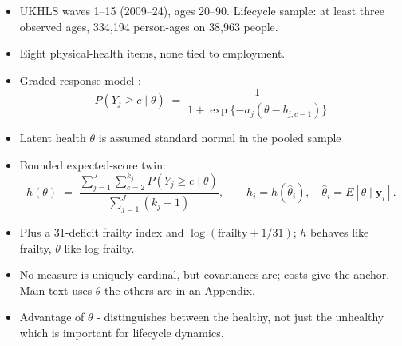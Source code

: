 \documentclass[11pt]{article}
\begin{document}

\begin{itemize}
	\item UKHLS waves 1--15 (2009--24), ages 20--90. Lifecycle sample: at least three observed ages, 334,194 person-ages on 38,963 people.
	\item Eight physical-health items, none tied to employment.
	\item Graded-response model \citep{samejima1969}:
	\begin{equation}
		P(Y_j \ge c \mid \theta) \;=\; \frac{1}{1 + \exp\{-a_j(\theta - b_{j,c-1})\}}
	\end{equation}
	\item Latent health $\theta$ is assumed standard normal in the pooled sample
	\item Bounded expected-score twin:
	\begin{equation}
		h(\theta) \;=\; \frac{\sum_{j=1}^{J} \sum_{c=2}^{k_j} P(Y_j \ge c \mid \theta)}{\sum_{j=1}^{J} (k_j - 1)},
		\qquad h_i = h(\hat\theta_i), \quad \hat\theta_i = E[\theta \mid \mathbf{y}_i].
	\end{equation}
	\item Plus a 31-deficit frailty index and $\log(\text{frailty}+1/31)$; $h$ behaves like frailty, $\theta$ like log frailty.
	\item No measure is uniquely cardinal, but covariances are; costs give the anchor. Main text uses $\theta$ the others are in an Appendix.
	\item Advantage of $\theta$ - distinguishes between the healthy, not just the unhealthy which is important for lifecycle dynamics.
\end{itemize}
\end{document}
